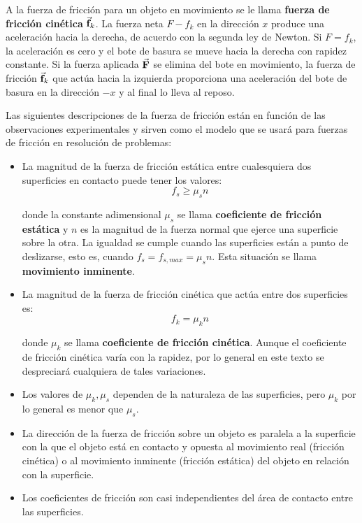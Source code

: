     \PN A la fuerza de fricción para un objeto en movimiento se le llama \textbf{fuerza de fricción cinética}
    $\vec{\mathbf{f}}_{k}$. La fuerza neta $F-f_{k}$ en la dirección $x$ produce una aceleración hacia la derecha, de acuerdo con
    la segunda ley de Newton. Si $F = f_{k}$, la aceleración es cero y el bote de basura se mueve hacia la derecha con
    rapidez constante. Si la fuerza aplicada $\vec{\mathbf{F}}$ se elimina del bote en movimiento, la fuerza de fricción
    $\vec{\mathbf{f}}_{k}$ que actúa hacia la izquierda proporciona una aceleración del bote de basura en la dirección $-x$ y al
    final lo lleva al reposo.

    \PN Las siguientes descripciones de la fuerza de fricción están en función de las observaciones experimentales y
    sirven como el modelo que se usará para fuerzas de fricción en resolución de problemas:

    \begin{itemize}
      \item La magnitud de la fuerza de fricción estática entre cualesquiera dos superficies en contacto puede tener los
      valores:
        \[
          f_{s} \geq \mu_{s} n
        \]

      \PN donde la constante adimensional $\mu_{s}$ se llama \textbf{coeficiente de fricción estática} y $n$ es la
      magnitud de la fuerza normal que ejerce una superficie sobre la otra. La igualdad se cumple cuando las superficies
      están a punto de deslizarse, esto es, cuando $f_{s} = f_{s, max} = \mu_{s} n$. Esta situación se llama
      \textbf{movimiento inminente}.

      \item La magnitud de la fuerza de fricción cinética que actúa entre dos superficies es:
        \[
          f_{k} = \mu_{k} n
        \]

        \PN donde $\mu_{k}$ se llama \textbf{coeficiente de fricción cinética}. Aunque el coeficiente de fricción
        cinética varía con la rapidez, por lo general en este texto se despreciará cualquiera de tales variaciones.

      \item Los valores de $\mu_{k}, \mu_{s}$ dependen de la naturaleza de las superficies, pero $\mu_{k}$ por lo
      general es menor que $\mu_{s}$.

      \item La dirección de la fuerza de fricción sobre un objeto es paralela a la superficie con la que el objeto está
      en contacto y opuesta al movimiento real (fricción cinética) o al movimiento inminente (fricción estática) del
      objeto en relación con la superficie.

      \item Los coeficientes de fricción son casi independientes del área de contacto entre las superficies.
    \end{itemize}
